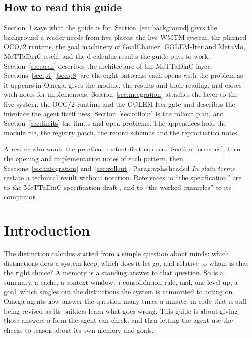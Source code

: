 \documentclass[11pt]{article}
\theoremstyle{definition}
\theoremstyle{plain}
\begin{document}
\subsection*{How to read this guide}
Section~\ref{sec:intro} says what the guide is for. Section~\ref{sec:background} gives the
background a reader needs from five places: the live WMTM system, the planned OCO/2 runtime,
the goal machinery of GoalChainer, GOLEM-Iter and MetaMo, MeTTaDinC itself, and the d-calculus
results the guide puts to work. Section~\ref{sec:arch} describes the architecture of the MeTTaDinC
layer. Sections~\ref{sec:p1}--\ref{sec:p8} are the eight patterns; each opens with the problem as
it appears in Omega, gives the module, the results and their reading, and closes with notes for
implementers. Section~\ref{sec:integration} attaches the layer to the live system, the OCO/2
runtime and the GOLEM-Iter gate and describes the interface the agent itself uses.
Section~\ref{sec:rollout} is the rollout plan, and Section~\ref{sec:limits} the limits and open
problems. The appendices hold the module file, the registry patch, the record schemas and the
reproduction notes.

A reader who wants the practical content first can read Section~\ref{sec:arch}, then the opening
and implementation notes of each pattern, then Sections~\ref{sec:integration}
and~\ref{sec:rollout}. Paragraphs headed \emph{In plain terms} restate a technical result without
notation. References to ``the specification'' are to the MeTTaDinC specification draft
\cite{spec}, and to ``the worked examples'' to its companion \cite{worked}.

\clearpage
{\setlength{\parskip}{0pt}\tableofcontents}
\clearpage

\section{Introduction}\label{sec:intro}

The distinction calculus started from a simple question about minds: which distinctions does a
system keep, which does it let go, and relative to whom is that the right choice? A memory is a
standing answer to that question. So is a summary, a cache, a context window, a consolidation
rule, and, one level up, a goal, which singles out the distinctions the system is committed to
acting on. Omega agents now answer the question many times a minute, in code that is still being
revised as its builders learn what goes wrong. This guide is about giving those answers a
form the agent can check, and then letting the agent use the checks to reason about its own memory
and goals.
\end{document}
